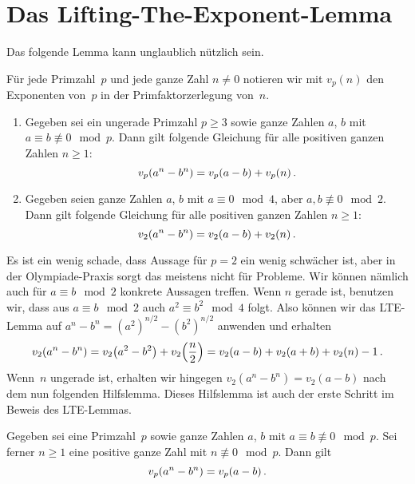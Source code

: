 \section{Das Lifting-The-Exponent-Lemma}\label{kapitel:LTE}
Das folgende Lemma kann unglaublich nützlich sein.
\begin{satzmitnamen}
	Für jede Primzahl~$p$ und jede ganze Zahl $n\neq 0$ notieren wir mit $v_p(n)$ den Exponenten von~$p$ in der Primfaktorzerlegung von~$n$.
	\begin{enumerate}
		\item Gegeben sei ein ungerade Primzahl $p\geqslant 3$ sowie ganze Zahlen $a$, $b$ mit $a\equiv b\not\equiv 0\mod p$. Dann gilt folgende Gleichung für alle positiven ganzen Zahlen $n\geqslant 1$:\label{behauptung:LTEpUngerade}
		\begin{equation*}
			v_p\parens*{a^n-b^n}=v_p(a-b)+v_p(n)\,.
		\end{equation*}
		\item Gegeben seien ganze Zahlen $a$, $b$ mit $a\equiv 0\mod 4$, aber $a,b\not\equiv 0\mod 2$. Dann gilt folgende Gleichung für alle positiven ganzen Zahlen $n\geqslant 1$:\label{behauptung:LTEp=2}
		\begin{equation*}
			v_2\parens*{a^n-b^n}=v_2(a-b)+v_2(n)\,.
		\end{equation*}
	\end{enumerate}
\end{satzmitnamen}
Es ist ein wenig schade, dass Aussage für $p=2$ ein wenig schwächer ist, aber in der Olympiade-Praxis sorgt das meistens nicht für Probleme. Wir können nämlich auch für $a\equiv b\mod 2$ konkrete Aussagen treffen. Wenn $n$ gerade ist, benutzen wir, dass aus $a\equiv b\mod 2$ auch $a^2\equiv b^2\mod 4$ folgt. Also können wir das LTE-Lemma auf $a^n-b^n=(a^2)^{n/2}-(b^2)^{n/2}$ anwenden und erhalten
\begin{equation*}
	v_2\parens*{a^n-b^n}=v_2\parens*{a^2-b^2}+v_2\parens*{\frac n2}=v_2(a-b)+v_2(a+b)+v_2(n)-1\,.
\end{equation*}
Wenn~$n$ ungerade ist, erhalten wir hingegen $v_2(a^n-b^n)=v_2(a-b)$ nach dem nun folgenden Hilfslemma. Dieses Hilfslemma ist auch der erste Schritt im Beweis des LTE-Lemmas.
\begin{satzmitnamen}[Lemma]
	Gegeben sei eine Primzahl~$p$  sowie ganze Zahlen $a$, $b$ mit $a\equiv b\not\equiv 0\mod p$. Sei ferner $n\geqslant 1$ eine positive ganze Zahl mit $n\not\equiv 0\mod p$. Dann gilt
	\begin{equation*}
		v_p\parens*{a^n-b^n}=v_p(a-b)\,.
	\end{equation*}
\end{satzmitnamen}
